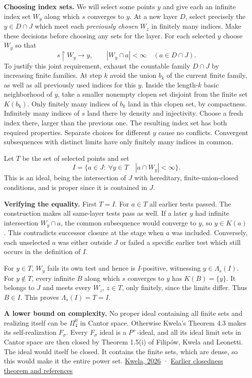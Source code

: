 \documentclass[11pt]{article}
\begin{document}
\textbf{Choosing index sets.} We will select some points \(y\) and give each an infinite index set \(W_y\) along which \(s\) converges to \(y\). At a new layer \(D\), select precisely the \(y\in D\cap J\) which meet each \emph{previously chosen} \(W_z\) in finitely many indices. Make these decisions before choosing any sets for the layer. For each selected \(y\) choose \(W_y\) so that \[s\!\upharpoonright W_y\longrightarrow y,\qquad |W_y\cap a|<\infty \quad(a\in D\cap J).\] To justify this joint requirement, exhaust the countable family \(D\cap J\) by increasing finite families. At step \(k\) avoid the union \(b_k\) of the current finite family, as well as all previously used indices for this \(y\). Inside the length-\(k\) basic neighborhood of \(y\), take a smaller nonempty clopen set disjoint from the finite set \(K(b_k)\). Only finitely many indices of \(b_k\) land in this clopen set, by compactness. Infinitely many indices of \(s\) land there by density and injectivity. Choose a fresh index there, larger than the previous one. The resulting index set has both required properties. Separate choices for different \(y\) cause no conflicts. Convergent subsequences with distinct limits have only finitely many indices in common.

Let \(T\) be the set of selected points and set \[I=\{a\in J:\ \forall y\in T\quad |a\cap W_y|<\infty\}.\] This is an ideal, being the intersection of \(J\) with hereditary, finite-union-closed conditions, and is proper since it is contained in \(J\).

\textbf{Verifying the equality.} First \(T=I\). For \(a\in T\) all earlier tests passed. The construction makes all same-layer tests pass as well. If a later \(y\) had infinite intersection \(W_y\cap a\), the common subsequence would converge to \(y\), so \(y\in K(a)\). This contradicts successor closure at the stage when \(a\) was included. Conversely, each unselected \(a\) was either outside \(J\) or failed a specific earlier test which still occurs in the definition of \(I\).

For \(y\in T\), \(W_y\) fails its own test and hence is \(I\)-positive, witnessing \(y\in\Lambda_s(I)\). For \(y\notin T\), every infinite \(B\) along which \(s\) converges to \(y\) has \(K(B)=\{y\}\). It belongs to \(J\) and meets every \(W_z\), \(z\in T\), only finitely, since the limits differ. Thus \(B\in I\). This proves \(\Lambda_s(I)=T=I\).

\textbf{A lower bound on complexity.} No proper ideal containing all finite sets and realizing itself can be \(\Pi^0_4\) in Cantor space. Otherwise Kwela's Theorem 4.3 makes its self-realization \(F_\sigma\). Every \(F_\sigma\) ideal is a \(P^+\)-ideal, and all its ideal limit sets in Cantor space are then closed by Theorem 1.5(i) of Filipów, Kwela and Leonetti. The ideal would itself be closed. It contains the finite sets, which are dense, so this would make it the entire power set. \href{https://arxiv.org/abs/2611.03432}{Kwela, 2026} · \href{https://arxiv.org/abs/2411.10866}{Earlier closedness theorem and references}
\end{document}
